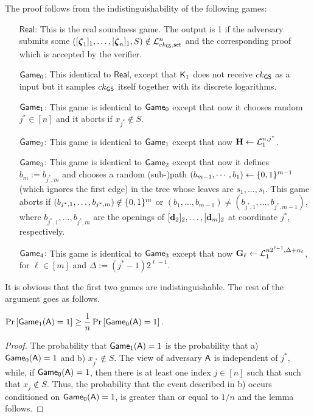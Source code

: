 The proof follows from the indistinguishability of the following games:
\begin{itemize}
\item[\(\mathsf{Real}\):] This is the real soundness game. The output is 1 if the adversary submits some \(([{\boldsymbol \zeta}_1]_1,\ldots,[{\boldsymbol \zeta}_n]_1,S)\notin\mathcal{L}_{ck_{\mathsf{GS}},\mathsf{set}}^n\) and the corresponding proof which is accepted by the verifier.
\item[\(\mathsf{Game}_0\):] This identical to \(\mathsf{Real}\), except that \(\mathsf{K}_1\) does not receive \(ck_{\mathsf{GS}}\) as a input but
it samples \(ck_{\mathsf{GS}}\) itself together with its discrete logarithms.
\item[\(\mathsf{Game}_1\):] This game is identical to \(\mathsf{Game}_0\) except that now it chooses random \(j^*\in[n]\) and it aborts if \(x_{j^*}\notin S\).
\item[\(\mathsf{Game}_2\):] This game is identical to \(\mathsf{Game}_1\) except that now \(\mathbf{{H}}\gets\mathcal{L}^{n,j^*}_1\).
\item[\(\mathsf{Game}_3\):] This game is identical to \(\mathsf{Game}_2\) except that now it defines $b_m:=b_{j^*,m}$ and chooses a random (sub-)path $(b_{m-1},\cdots, b_1)\gets\{0,1\}^{m-1}$ (which ignores the first edge) in the tree whose leaves are $s_1,\ldots,s_t$. This game aborts if \((b_{j^*,1},\ldots,b_{j^*,m})\notin\{0,1\}^m\) or \((b_1,\ldots, b_{m-1})\neq(b_{j^*,1},\ldots, b_{j^*,m-1})\), where \(b_{j^*,1},\ldots,b_{j^*,m}\) are the openings of \([\mathbf{d}_2]_2,\ldots,[\mathbf{d}_m]_2\) at coordinate \(j^*\), respectively.
\item[\(\mathsf{Game}_4\):] This game is identical to \(\mathsf{Game}_3\) except that now \(\mathbf{{G}}_\ell\gets\mathcal{L}_1^{n2^{\ell-1},\Delta+\alpha_\ell}\), for \(\ell\in [m]\) and $\Delta:=(j^*-1)2^{\ell-1}$.
\end{itemize}

It is obvious that the first two games are indistinguishable. The rest of the argument goes as follows.

\begin{lemma}
\(\Pr\left[ \mathsf{Game}_1(\mathsf{A})=1\right]\geq\dfrac{1}{n}\Pr\left[\mathsf{Game}_0(\mathsf{A})=1\right].\)
\end{lemma}

\begin{proof}  The probability that
 \(\mathsf{Game}_1(\mathsf{A})=1\) is the probability that  a) \(\mathsf{Game}_0(\mathsf{A})=1\) and
b)  \(x_{j^*} \notin S\). The view of adversary \(\mathsf{A}\) is independent of \(j^*\), while, if \(\mathsf{Game_0}(\mathsf{A})=1\), then there is at least one index \(j \in [n]\) such that  
such that  \(x_{j} \notin S\). Thus, 
the probability that the event described in b) occurs conditioned on \(\mathsf{Game_0}(\mathsf{A})=1\), is greater than or equal to \(1/n\) and the lemma follows.
\end{proof}


